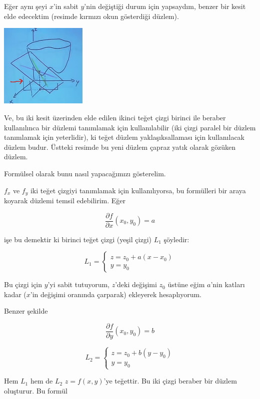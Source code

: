 \documentclass[12pt,fleqn]{article}\usepackage{../../common}
\begin{document}
Eğer aynı şeyi $x$'in sabit $y$'nin değiştiği durum için yapsaydım,
benzer bir kesit elde edecektim (resimde kırmızı okun gösterdiği düzlem). 

\begin{center}
\includegraphics[height=4cm]{9_2.png}
\end{center}

Ve, bu iki kesit üzerinden elde edilen ikinci teğet çizgi birinci ile beraber
kullanılınca bir düzlemi tanımlamak için kullanılabilir (iki çizgi paralel bir
düzlem tanımlamak için yeterlidir), ki teğet düzlem yaklaşıksallaması için
kullanılacak düzlem budur. Üstteki resimde bu yeni düzlem çapraz yatık olarak
gözüken düzlem.

Formülsel olarak bunu nasıl yapacağımızı gösterelim.

$f_x$ ve $f_y$ iki teğet çizgiyi tanımlamak için kullanılıyorsa, bu
formülleri bir araya koyarak düzlemi temsil edebilirim. Eğer

$$ \frac{\partial f}{\partial x}(x_0,y_0) = a $$

işe bu demektir ki birinci teğet çizgi (yeşil çizgi) $L_1$ şöyledir:

$$ 
L_1 = 
\left\{ \begin{array}{l}
z = z_0 + a(x - x_0) \\
y = y_0
\end{array} \right.
$$

Bu çizgi için $y$'yi sabit tutuyorum, $z$'deki değişimi $z_0$ üstüne eğim
$a$'nin katları kadar ($x$'in değişimi oranında çarparak) ekleyerek
hesaplıyorum. 

Benzer şekilde

$$ \frac{\partial f}{\partial y}(x_0,y_0) = b $$

$$ 
L_2 = 
\left\{ \begin{array}{l}
z = z_0 + b(y - y_0) \\
y = y_0
\end{array} \right.
$$

Hem $L_1$ hem de $L_2$ $z = f(x,y)$'ye teğettir. Bu iki çizgi beraber bir düzlem
oluşturur. Bu formül
\end{document}
